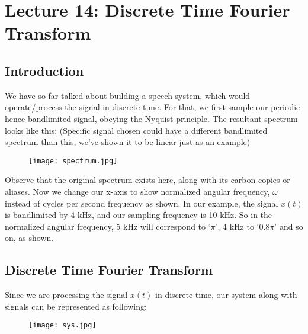 \section{Lecture 14: Discrete Time Fourier Transform }






\subsection{Introduction}
We have so far talked about building a speech system, which would operate/process the signal in discrete time. For that, we first sample our periodic hence bandlimited signal, obeying the Nyquist principle. The resultant spectrum looks like this: (Specific signal chosen could have a different bandlimited spectrum than this, we've shown it to be linear just as an example)

\begin{figure}[htb]
\centering
\texttt{[image: spectrum.jpg]}
\caption{\label{fig:spectrum}}
\end{figure}

Observe that the original spectrum exists here, along with its carbon copies or aliases. Now we change our x-axis to show normalized angular frequency, $\omega$ instead of cycles per second frequency as shown. In our example, the signal $x(t)$ is bandlimited by 4 kHz, and our sampling frequency is 10 kHz. So in the normalized angular frequency, 5 kHz will correspond to `$\pi$', 4 kHz to `$0.8\pi$' and so on, as shown.

\subsection{Discrete Time Fourier Transform}
Since we are processing the signal $x(t)$ in discrete time, our system along with signals can be represented as following:

\begin{figure}[htb]
\centering
\texttt{[image: sys.jpg]}
\caption{}
\end{figure}

